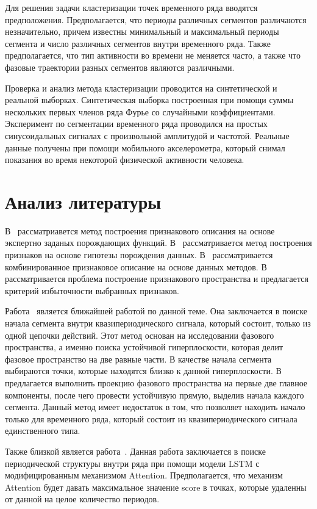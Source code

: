 \documentclass[12pt, twoside]{article}
\numberwithin{equation}{section}
\begin{document}
Для решения задачи кластеризации точек временного ряда вводятся предположения. 
Предполагается, что периоды различных сегментов различаются незначительно, причем известны минимальный и максимальный периоды сегмента и число различных сегментов внутри временного ряда. 
Также предполагается, что тип активности во времени не меняется часто, а также что фазовые траектории разных сегментов являются различными. 

Проверка и анализ метода кластеризации проводится на синтетической и реальной выборках. 
Синтетическая выборка построенная при помощи суммы нескольких первых членов ряда Фурье со случайными коэффициентами. 
Эксперимент по сегментации временного ряда проводился на простых синусоидальных сигналах с произвольной амплитудой и частотой. 
Реальные данные получены при помощи мобильного акселерометра, который снимал показания во время некоторой физической активности человека. 

\section{Анализ литературы}
В~\cite{kwapisz2010} рассматриавется метод построения признакового описания на основе экспертно заданых порождающих функций.
В~\cite{lukashin2003} рассматривается метод построения признаков на основе гипотезы порождения данных. 
В~\cite{Ivkin2015} рассматривается комбинированное признаковое описание на основе данных методов. 
В~\cite{Katrutsa2015} рассматривается проблема построение признакового пространства и предлагается критерий избыточности выбранных признаков.

Работа~\cite{motrenko2015} является ближайшей работой по данной теме. 
Она заключается в поиске начала сегмента внутри квазипериодического сигнала, который состоит, только из одной цепочки действий. 
Этот метод основан на исследовании фазового пространства, а именно поиска устойчивой гиперплоскости, которая делит фазовое пространство на две равные части. 
В качестве начала сегмента выбираются точки, которые находятся близко к данной гиперплоскости.
В~\cite{motrenko2015} предлагается выполнить проекцию фазового пространства на первые две главное компоненты, после чего провести устойчивую прямую, выделив начала каждого сегмента. 
Данный метод имеет недостаток в том, что позволяет находить начало только для временного ряда, который состоит из квазипериодического сигнала единственного типа.


Также близкой является работа~\cite{cinar2018}. Данная работа заключается в поиске периодической структуры внутри ряда при помощи модели LSTM с модифицированным механизмом Attention. Предполагается, что механизм Attention будет давать максимальное значение score в точках, которые удаленны от данной на целое количество периодов.
\end{document}

